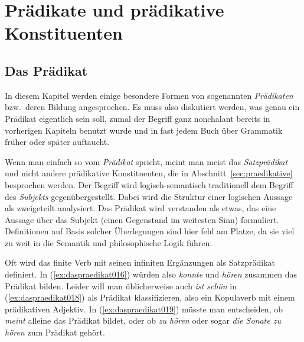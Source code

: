 
\section{Prädikate und prädikative Konstituenten}
\label{sec:praedikateundpraedikativekonstituenten}

\subsection{Das Prädikat}
\label{sec:daspraedikat}


In diesem Kapitel werden einige besondere Formen von sogenannten \textit{Prädikaten} bzw.\ deren Bildung angesprochen.
Es muss also diskutiert werden, was genau ein Prädikat eigentlich sein soll, zumal der Begriff ganz nonchalant bereits in vorherigen Kapiteln benutzt wurde und in fast jedem Buch über Grammatik früher oder später auftaucht.


Wenn man einfach so vom \textit{Prädikat} spricht, meint man meist das \textit{Satzprädikat} und nicht andere prädikative Konstituenten, die in Abschnitt~\ref{sec:praedikative} besprochen werden.
Der Begriff wird logisch-semantisch traditionell dem Begriff des \textit{Subjekts} gegenübergestellt.
Dabei wird die Struktur einer logischen Aussage als zweigeteilt analysiert.
Das Prädikat wird verstanden als etwas, das eine Aussage über das Subjekt (einen Gegenstand im weitesten Sinn) formuliert.
Definitionen auf Basis solcher Überlegungen sind hier fehl am Platze, da sie viel zu weit in die Semantik und philosophische Logik führen.

Oft wird das finite Verb mit seinen infiniten Ergänzungen als Satzprädikat definiert.
In (\ref{ex:daspraedikat016}) würden also \textit{konnte} und \textit{hören} zusammen das Prädikat bilden.
Leider will man üblicherweise auch \textit{ist schön} in (\ref{ex:daspraedikat018}) als Prädikat klassifizieren, also ein Kopulaverb mit einem prädikativen Adjektiv.
In (\ref{ex:daspraedikat019}) müsste man entscheiden, ob \textit{meint} alleine das Prädikat bildet, oder ob \textit{zu hören} oder sogar \textit{die Sonate zu hören} zum Prädikat gehört.

\begin{exe}
  \ex\label{ex:daspraedikat016}
  \begin{xlist}
  \end{xlist}
\end{exe}

